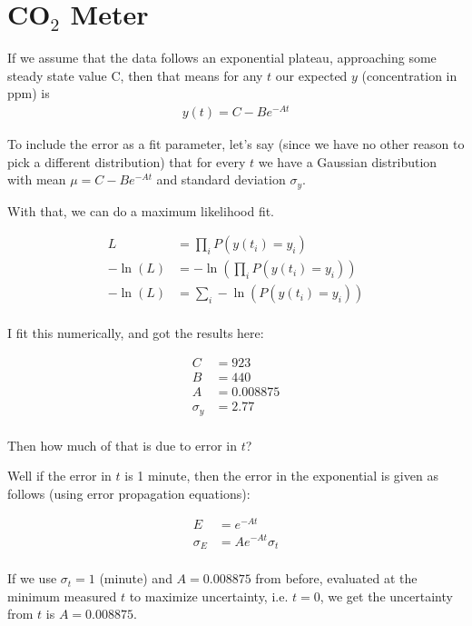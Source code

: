 \section{\texorpdfstring{CO$_2$}{CO2} Meter}

If we assume that the data follows an exponential plateau, approaching some steady state value C, then that means for any $t$ our expected $y$ (concentration in ppm) is
\begin{align*}
    y(t) = C - B e^{-At}
\end{align*}

To include the error as a fit parameter, let's say (since we have no other reason to pick a different distribution) that for every $t$ we have a Gaussian distribution with mean $\mu = C - B e^{-At}$ and standard deviation $\sigma_y$.

With that, we can do a maximum likelihood fit.

\begin{align*}
    L &= \prod_i P(y(t_i)=y_i) \\
    -\ln(L) &= -\ln(\prod_i P(y(t_i)=y_i)) \\
    -\ln(L) &= \sum_i -\ln(P(y(t_i)=y_i)) \\
\end{align*}

I fit this numerically, and got the results here:

\begin{align*}
    C &= 923 \\
    B &= 440 \\
    A &= 0.008875\\
    \sigma_y &= 2.77 \\
\end{align*}

Then how much of that is due to error in $t$?

Well if the error in $t$ is 1 minute, then the error in the exponential is given as follows (using error propagation equations):

\begin{align*}
    E &= e^{-At} \\
    \sigma_E &= Ae^{-At}\sigma_t \\
\end{align*}

If we use $\sigma_t = 1$ (minute) and $A=0.008875$ from before, evaluated at the minimum measured $t$ to maximize uncertainty, i.e. $t=0$, we get the uncertainty from $t$ is $A=0.008875$.

